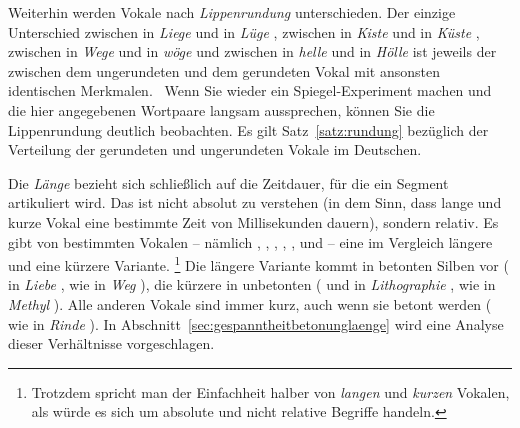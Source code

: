 Weiterhin werden Vokale nach \textit{Lippenrundung} unterschieden.
Der einzige Unterschied
zwischen \textipa{[i]} in \textit{Liege} \textipa{[li:g@]} und \textipa{[y]} in \textit{Lüge} \textipa{[ly:g@]},
zwischen \textipa{[I]} in \textit{Kiste} \textipa{[kIst@]} und \textipa{[Y]} in \textit{Küste} \textipa{[kYst@]},
zwischen \textipa{[e]} in \textit{Wege} \textipa{[ve:g@]} und \textipa{[\o]} in \textit{wöge} \textipa{[v\o:g@]}
und zwischen \textipa{[E]} in \textit{helle} \textipa{[hEl@]} und \textipa{[\oe]} in \textit{Hölle} \textipa{[h{\oe}l@]}
ist jeweils der zwischen dem ungerundeten und dem gerundeten Vokal mit ansonsten identischen Merkmalen.
\TuBegin~Wenn Sie wieder ein Spiegel-Experiment machen und die hier angegebenen Wortpaare langsam aussprechen, können Sie die Lippenrundung deutlich beobachten.
Es gilt Satz~\ref{satz:rundung} bezüglich der Verteilung der gerundeten und ungerundeten Vokale im Deutschen.


Die \textit{Länge} bezieht sich schließlich auf die Zeitdauer, für die ein Segment artikuliert wird.
Das ist nicht absolut zu verstehen (in dem Sinn, dass lange und kurze Vokal eine bestimmte Zeit von Millisekunden dauern), sondern relativ.
Es gibt von bestimmten Vokalen -- nämlich \textipa{[i]}, \textipa{[y]}, \textipa{[u]}, \textipa{[e]}, \textipa{[\o]}, \textipa{[o]} und \textipa{[a]} -- eine im Vergleich längere und eine kürzere Variante.%
\footnote{Trotzdem spricht man der Einfachheit halber von \textit{langen} und \textit{kurzen} Vokalen, als würde es sich um absolute und nicht relative Begriffe handeln.}
Die längere Variante kommt in betonten Silben vor (\textipa{[i:]} in \textit{Liebe} \textipa{[li:b@]}, \textipa{[e:]} wie in \textit{Weg} \textipa{[ve:k]}), die kürzere in unbetonten (\textipa{[i]} und \textipa{[o]} in \textit{Lithographie} \textipa{[litogKafi:]}, \textipa{[e]} wie in \textit{Methyl} \mbox{\textipa{[mety:l]}}).
Alle anderen Vokale sind immer kurz, auch wenn sie betont werden (\textipa{[I]} wie in \textit{Rinde} \textipa{[KInd@]}).
In Abschnitt~\ref{sec:gespanntheitbetonunglaenge} wird eine Analyse dieser Verhältnisse vorgeschlagen.

